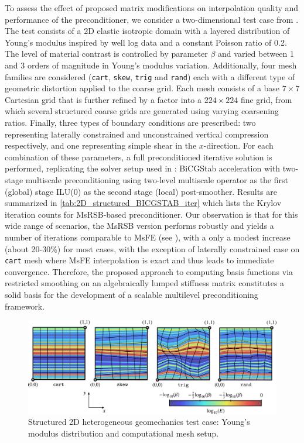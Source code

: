 To assess the effect of proposed matrix modifications on interpolation quality and performance of the preconditioner, we consider a two-dimensional test case from \cite{Castelletto2017}.   The test consists of a 2D elastic isotropic domain with a layered distribution of Young's modulus inspired by well log data and a constant Poisson ratio of 0.2.   The level of material contrast is controlled by parameter $\beta$ and varied between 1 and 3 orders of magnitude in Young's modulus variation.   Additionally, four mesh families are considered (\texttt{cart}, \texttt{skew}, \texttt{trig} and \texttt{rand}) each with a different type of geometric distortion applied to the coarse grid.   Each mesh consists of a base $7 \times 7$ Cartesian grid that is further refined by a factor into a $224 \times 224$ fine grid, from which several structured coarse grids are generated using varying coarsening ratios.   Finally, three types of boundary conditions are prescribed: two representing laterally constrained and unconstrained vertical compression respectively, and one representing simple shear in the $x$-direction.   For each combination of these parameters, a full preconditioned iterative solution is performed, replicating the solver setup used in \cite{Castelletto2017}: BiCGStab acceleration with two-stage multiscale preconditioning using two-level multiscale operator as the first (global) stage ILU(0) as the second stage (local) post-smoother.   Results are summarized in \cref{tab:2D_structured_BICGSTAB_iter} which lists the Krylov iteration counts for MsRSB-based preconditioner.   Our observation is that for this wide range of scenarios, the MsRSB version performs robustly and yields a number of iterations comparable to MsFE (see \cite{Castelletto2017}), with a only a modest increase (about 20-30\%) for most cases, with the exception of laterally constrained case on \texttt{cart} mesh where MsFE interpolation is exact and thus leads to immediate convergence.   Therefore, the proposed approach to computing basis functions via restricted smoothing on an algebraically lumped stiffness matrix constitutes a solid basis for the development of a scalable multilevel preconditioning framework.

\begin{figure}[htbp]
    \centering
    \includegraphics[width=\textwidth]{figs/MsRSB/2D_structured_young}
    \caption[Structured 2D heterogeneous geomechanics test case]{Structured 2D heterogeneous geomechanics test case: Young's modulus distribution and computational mesh setup.}
    \label{fig:2D_structured_young}
\end{figure}

